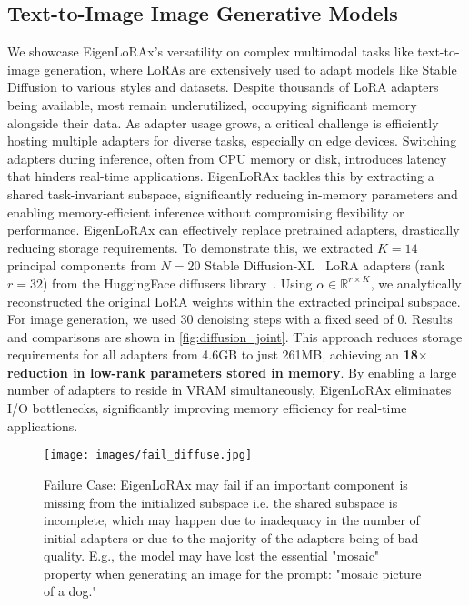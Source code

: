 \subsection{Text-to-Image Image Generative Models}
\label{sec:diffusion}
We showcase EigenLoRAx's versatility on complex multimodal tasks like text-to-image generation, where LoRAs are extensively used to adapt models like Stable Diffusion to various styles and datasets. Despite thousands of LoRA adapters being available, most remain underutilized, occupying significant memory alongside their data. As adapter usage grows, a critical challenge is efficiently hosting multiple adapters for diverse tasks, especially on edge devices. Switching adapters during inference, often from CPU memory or disk, introduces latency that hinders real-time applications. EigenLoRAx tackles this by extracting a shared task-invariant subspace, significantly reducing in-memory parameters and enabling memory-efficient inference without compromising flexibility or performance.
EigenLoRAx can effectively replace pretrained adapters, drastically reducing storage requirements. To demonstrate this, we extracted $K=14$ principal components from $N=20$ Stable Diffusion-XL~\citep{sdxl} LoRA adapters (rank $r=32$) from the HuggingFace diffusers library~\citep{von-platen-etal-2022-diffusers}. Using $\alpha \in \mathbb{R}^{r \times K}$, we analytically reconstructed the original LoRA weights within the extracted principal subspace. For image generation, we used 30 denoising steps with a fixed seed of 0. Results and comparisons are shown in \cref{fig:diffusion_joint}. This approach reduces storage requirements for all adapters from 4.6GB to just 261MB, achieving an \textbf{18$\times$ reduction in low-rank parameters stored in memory}. By enabling a large number of adapters to reside in VRAM simultaneously, EigenLoRAx eliminates I/O bottlenecks, significantly improving memory efficiency for real-time applications.
\begin{figure*}[!hbt]
\begin{center}
\texttt{[image: images/fail\_diffuse.jpg]}
\end{center}
\caption{Failure Case: EigenLoRAx may fail if an important component is missing from the initialized subspace i.e. the shared subspace is incomplete, which may happen due to inadequacy in the number of initial adapters or due to the majority of the adapters being of bad quality. E.g., the model may have lost the essential "mosaic" property when generating an image for the prompt: "mosaic picture of a dog."}
\label{fig:failurediffusion}
\end{figure*}
